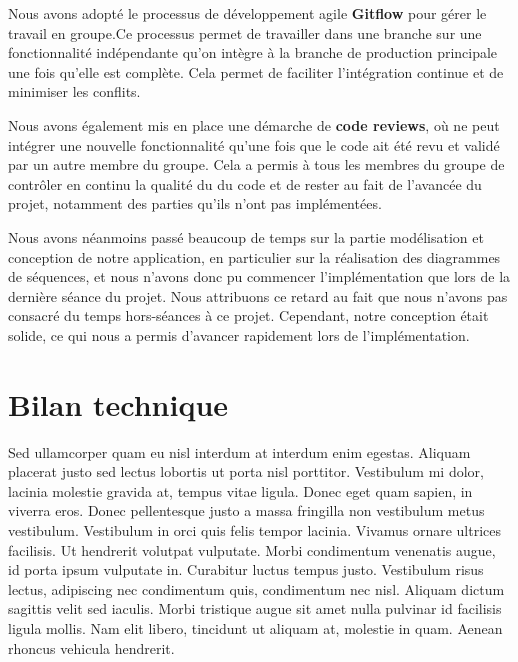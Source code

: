 Nous avons adopté le processus de développement agile \textbf{Gitflow} pour gérer le travail en groupe.Ce processus permet de travailler dans une branche sur une fonctionnalité indépendante qu'on intègre à la branche de production principale une fois qu'elle est complète. Cela permet de faciliter l'intégration continue et de minimiser les conflits.

Nous avons également mis en place une démarche de \textbf{code reviews}, où ne peut intégrer une nouvelle fonctionnalité qu'une fois que le code ait été revu et validé par un autre membre du groupe. Cela a permis à tous les membres du groupe de contrôler en continu la qualité du du code et de rester au fait de l'avancée du projet, notamment des parties qu'ils n'ont pas implémentées.

Nous avons néanmoins passé beaucoup de temps sur la partie modélisation et conception de notre application, en particulier sur la réalisation des diagrammes de séquences, et nous n'avons donc pu commencer l'implémentation que lors de la dernière séance du projet. Nous attribuons ce retard au fait que nous n'avons pas consacré du temps hors-séances à ce projet. Cependant, notre conception était solide, ce qui nous a permis d'avancer rapidement lors de l'implémentation.  

\section{Bilan technique}

Sed ullamcorper quam eu nisl interdum at interdum enim egestas. Aliquam placerat justo sed lectus lobortis ut porta nisl porttitor. Vestibulum mi dolor, lacinia molestie gravida at, tempus vitae ligula. Donec eget quam sapien, in viverra eros. Donec pellentesque justo a massa fringilla non vestibulum metus vestibulum. Vestibulum in orci quis felis tempor lacinia. Vivamus ornare ultrices facilisis. Ut hendrerit volutpat vulputate. Morbi condimentum venenatis augue, id porta ipsum vulputate in. Curabitur luctus tempus justo. Vestibulum risus lectus, adipiscing nec condimentum quis, condimentum nec nisl. Aliquam dictum sagittis velit sed iaculis. Morbi tristique augue sit amet nulla pulvinar id facilisis ligula mollis. Nam elit libero, tincidunt ut aliquam at, molestie in quam. Aenean rhoncus vehicula hendrerit.